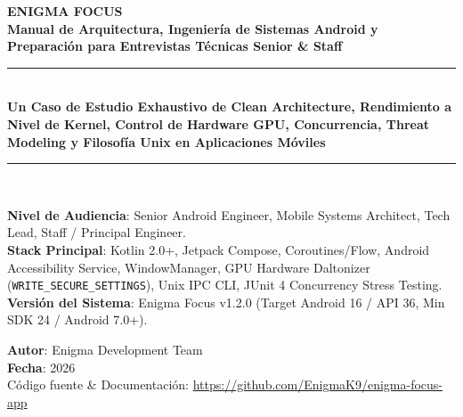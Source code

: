 \documentclass[11pt,a4paper,oneside]{report}
\begin{document}
\begin{titlepage}
    \centering
    \vspace*{0.6cm}
    
    {\Huge \textbf{\color{primaryDark}ENIGMA FOCUS}}\\[0.4cm]
    {\LARGE \textbf{\color{accentGreen}Manual de Arquitectura, Ingeniería de Sistemas Android y Preparación para Entrevistas Técnicas Senior \& Staff}}\\[0.6cm]
    
    \rule{\linewidth}{2pt}\\[0.4cm]
    {\large \textbf{Un Caso de Estudio Exhaustivo de Clean Architecture, Rendimiento a Nivel de Kernel, Control de Hardware GPU, Concurrencia, Threat Modeling y Filosofía Unix en Aplicaciones Móviles}}\\[0.4cm]
    \rule{\linewidth}{2pt}\\[0.8cm]
    
    \begin{tcolorbox}[colback=secondaryDark,colframe=primaryDark,center,width=0.95\linewidth]
        \color{white}
        \textbf{Nivel de Audiencia}: Senior Android Engineer, Mobile Systems Architect, Tech Lead, Staff / Principal Engineer.\\[0.2cm]
        \textbf{Stack Principal}: Kotlin 2.0+, Jetpack Compose, Coroutines/Flow, Android Accessibility Service, WindowManager, GPU Hardware Daltonizer (\texttt{WRITE\_SECURE\_SETTINGS}), Unix IPC CLI, JUnit 4 Concurrency Stress Testing.\\[0.2cm]
        \textbf{Versión del Sistema}: Enigma Focus v1.2.0 (Target Android 16 / API 36, Min SDK 24 / Android 7.0+).
    \end{tcolorbox}
    
    \vfill
    
    {\large \textbf{Autor}: Enigma Development Team}\\[0.2cm]
    {\large \textbf{Fecha}: 2026}\\[0.2cm]
    {\small Código fuente \& Documentación: \url{https://github.com/EnigmaK9/enigma-focus-app}}
    
    \vspace*{0.3cm}
\end{titlepage}

\tableofcontents
\newpage
\end{document}

